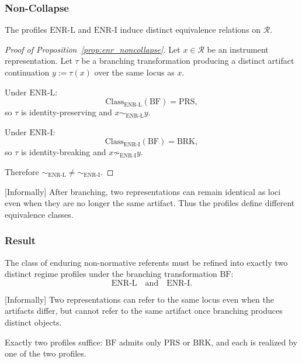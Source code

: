 \subsubsection{Non-Collapse}

\begin{proposition}
\label{prop:enr_noncollapse}
The profiles $\mathrm{ENR\mbox{-}L}$ and $\mathrm{ENR\mbox{-}I}$ induce
distinct equivalence relations on $\mathcal{R}$.
\end{proposition}

\begin{proof}[Proof of Proposition~\ref{prop:enr_noncollapse}]
Let $x \in \mathcal{R}$ be an instrument representation.
Let $\tau$ be a branching transformation producing a distinct artifact
continuation $y := \tau(x)$ over the same locus as $x$.

Under $\mathrm{ENR\mbox{-}L}$:
\[
\mathrm{Class}_{\mathrm{ENR\mbox{-}L}}(\mathrm{BF}) = \mathrm{PRS},
\]
so $\tau$ is identity-preserving and $x \sim_{\mathrm{ENR\mbox{-}L}} y$.

Under $\mathrm{ENR\mbox{-}I}$:
\[
\mathrm{Class}_{\mathrm{ENR\mbox{-}I}}(\mathrm{BF}) = \mathrm{BRK},
\]
so $\tau$ is identity-breaking and $x \not\sim_{\mathrm{ENR\mbox{-}I}} y$.

Therefore $\sim_{\mathrm{ENR\mbox{-}L}} \neq \sim_{\mathrm{ENR\mbox{-}I}}$.
\end{proof}

[Informally]
After branching, two representations can remain identical as loci
even when they are no longer the same artifact.
Thus the profiles define different equivalence classes.


\subsubsection{Result}

\begin{theorem}
The class of enduring non-normative referents must be refined into exactly two
distinct regime profiles under the branching transformation $\mathrm{BF}$:
\[
\mathrm{ENR\mbox{-}L}
\quad\text{and}\quad
\mathrm{ENR\mbox{-}I}.
\]
\end{theorem}

[Informally]
Two representations can refer to the same locus even when the artifacts differ,
but cannot refer to the same artifact once branching produces distinct objects.

Exactly two profiles suffice: $\mathrm{BF}$ admits only $\mathrm{PRS}$
or $\mathrm{BRK}$, and each is realized by one of the two profiles.
